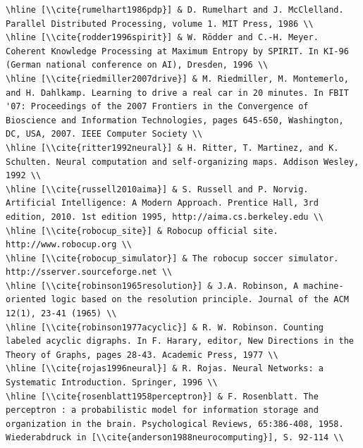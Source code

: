 \documentclass[10pt]{book}
\begin{document}
\begin{verbatim}
\hline [\\cite{rumelhart1986pdp}] & D. Rumelhart and J. McClelland. Parallel Distributed Processing, volume 1. MIT Press, 1986 \\
\hline [\\cite{rodder1996spirit}] & W. Rödder and C.-H. Meyer. Coherent Knowledge Processing at Maximum Entropy by SPIRIT. In KI-96 (German national conference on AI), Dresden, 1996 \\
\hline [\\cite{riedmiller2007drive}] & M. Riedmiller, M. Montemerlo, and H. Dahlkamp. Learning to drive a real car in 20 minutes. In FBIT '07: Proceedings of the 2007 Frontiers in the Convergence of Bioscience and Information Technologies, pages 645-650, Washington, DC, USA, 2007. IEEE Computer Society \\
\hline [\\cite{ritter1992neural}] & H. Ritter, T. Martinez, and K. Schulten. Neural computation and self-organizing maps. Addison Wesley, 1992 \\
\hline [\\cite{russell2010aima}] & S. Russell and P. Norvig. Artificial Intelligence: A Modern Approach. Prentice Hall, 3rd edition, 2010. 1st edition 1995, http://aima.cs.berkeley.edu \\
\hline [\\cite{robocup_site}] & Robocup official site. http://www.robocup.org \\
\hline [\\cite{robocup_simulator}] & The robocup soccer simulator. http://sserver.sourceforge.net \\
\hline [\\cite{robinson1965resolution}] & J.A. Robinson, A machine-oriented logic based on the resolution principle. Journal of the ACM 12(1), 23-41 (1965) \\
\hline [\\cite{robinson1977acyclic}] & R. W. Robinson. Counting labeled acyclic digraphs. In F. Harary, editor, New Directions in the Theory of Graphs, pages 28-43. Academic Press, 1977 \\
\hline [\\cite{rojas1996neural}] & R. Rojas. Neural Networks: a Systematic Introduction. Springer, 1996 \\
\hline [\\cite{rosenblatt1958perceptron}] & F. Rosenblatt. The perceptron : a probabilistic model for information storage and organization in the brain. Psychological Reviews, 65:386-408, 1958. Wiederabdruck in [\\cite{anderson1988neurocomputing}], S. 92-114 \\

\end{verbatim}
\end{document}
